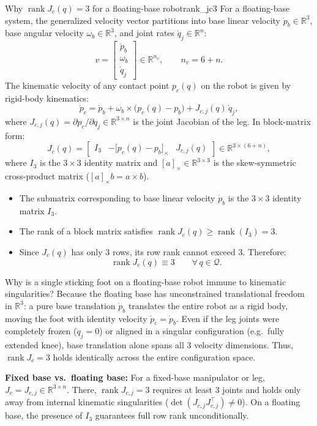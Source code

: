 \documentclass[11pt,a4paper]{article}
\newcommand{\R}{\mathbb{R}}
\DeclareMathOperator{\rank}{rank}
\begin{document}
\begin{proposition}{Why $\rank J_c(q) = 3$ for a floating-base robot}{rank_jc3}
For a floating-base system, the generalized velocity vector partitions into base linear velocity $\dot p_b \in \R^3$, base angular velocity $\omega_b \in \R^3$, and joint rates $\dot q_j \in \R^n$:
\[
  v = \begin{bmatrix} \dot p_b \\ \omega_b \\ \dot q_j \end{bmatrix} \in \R^{n_v}, \qquad n_v = 6 + n.
\]
The kinematic velocity of any contact point $p_c(q)$ on the robot is given by rigid-body kinematics:
\[
  \dot p_c = \dot p_b + \omega_b \times \big(p_c(q) - p_b\big) + J_{c,j}(q)\,\dot q_j ,
\]
where $J_{c,j}(q) = \partial p_c/\partial q_j \in \R^{3 \times n}$ is the joint Jacobian of the leg. In block-matrix form:
\begin{equation}\label{eq:jc_block}
  J_c(q) = \begin{bmatrix} I_3 & -\big[p_c(q)-p_b\big]_\times & J_{c,j}(q) \end{bmatrix} \in \R^{3 \times (6+n)},
\end{equation}
where $I_3$ is the $3\times 3$ identity matrix and $[a]_\times \in \R^{3\times 3}$ is the skew-symmetric cross-product matrix ($[a]_\times b = a \times b$).
\begin{itemize}[nosep]
  \item The submatrix corresponding to base linear velocity $\dot p_b$ is the $3\times 3$ identity matrix $I_3$.
  \item The rank of a block matrix satisfies $\rank J_c(q) \ge \rank(I_3) = 3$.
  \item Since $J_c(q)$ has only $3$ rows, its row rank cannot exceed $3$. Therefore:
  \begin{equation}
    \rank J_c(q) \equiv 3 \qquad \forall\, q \in \mathcal Q.
  \end{equation}
\end{itemize}
\end{proposition}

\begin{intuition}
Why is a single sticking foot on a floating-base robot immune to kinematic singularities?
Because the floating base has unconstrained translational freedom in $\R^3$: a pure base translation $\dot p_b$ translates the entire robot as a rigid body, moving the foot with identity velocity $\dot p_c = \dot p_b$. Even if the leg joints were completely frozen ($\dot q_j = 0$) or aligned in a singular configuration (e.g.\ fully extended knee), base translation alone spans all $3$ velocity dimensions. Thus, $\rank J_c = 3$ holds identically across the entire configuration space.

\textbf{Fixed base vs.\ floating base:}
For a fixed-base manipulator or leg, $J_c = J_{c,j} \in \R^{3 \times n}$. There, $\rank J_{c,j} = 3$ requires at least $3$ joints and holds only away from internal kinematic singularities ($\det(J_{c,j}J_{c,j}^\top) \neq 0$). On a floating base, the presence of $I_3$ guarantees full row rank unconditionally.
\end{intuition}
\end{document}

